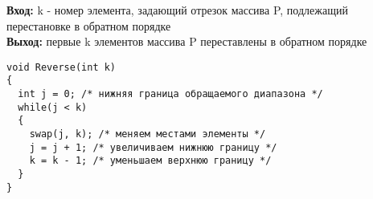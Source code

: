\documentclass[10pt, a5paper]{article}
\begin{document}

\noindent\textbf{Вход:} k - номер элемента, задающий отрезок массива P,
подлежащий перестановке в обратном порядке\\
\noindent\textbf{Выход:} первые k элементов массива P переставлены в
обратном порядке
\begin{lstlisting}
void Reverse(int k)
{
  int j = 0; /* нижняя граница обращаемого диапазона */
  while(j < k)
  {
    swap(j, k); /* меняем местами элементы */
    j = j + 1; /* увеличиваем нижнюю границу */
    k = k - 1; /* уменьшаем верхнюю границу */
  }
}
\end{lstlisting}
\end{document}
